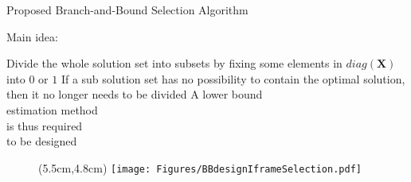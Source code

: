 \begin{frame}{Proposed Branch-and-Bound Selection Algorithm}
\begin{itemize}
	\myItem Main idea:
	\begin{itemize}
		\mySubItem Divide the whole solution set into subsets by fixing some elements in $diag(\mathbf{X})$ into $0$ or $1$
		\mySubItem If a sub solution set has no possibility to contain the optimal solution, then it no longer needs to be divided
		\mySubItem A lower bound \\
				   estimation method \\
				   is thus required \\
				   to be designed
	\end{itemize}
\end{itemize}
%
\begin{figure}
\centering
\begin{textblock*}{1cm}(5.5cm,4.8cm) %
\texttt{[image: Figures/BBdesignIframeSelection.pdf]}
\end{textblock*}
\end{figure}
%
\end{frame}
